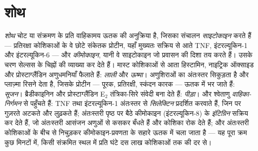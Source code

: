 \section{शोथ}

\begin{definition}[तीव्र शोथ]\label{def:b3:innate-immunity:inflammation}
\emph{शोथ} चोट या संक्रमण के प्रति वाहिकामय ऊतक की अनुक्रिया है, जिसका
संचालन \emph{साइटोकाइन} करते हैं --- प्रतिरक्षा कोशिकाओं के वे छोटे
संकेतक प्रोटीन, यहाँ मुख्यतः सक्रिय  से आते TNF,
इंटरल्यूकिन-1 और इंटरल्यूकिन-6 --- और \emph{कीमोकाइन}, यानी वे
साइटोकाइन जो प्रवासन की दिशा तय करते हैं। उसके चरण सेल्सस के चिह्नों की
व्याख्या कर देते हैं। मास्ट कोशिकाओं से आता हिस्टामिन, नाइट्रिक
ऑक्साइड और प्रोस्टाग्लैंडिन अणुधमनियाँ फैलाते हैं: \emph{लाली} और
\emph{ऊष्मा}। अणुशिराओं का अंतःस्तर सिकुड़ता है और प्लाज़्मा रिसने देता
है, जिसके प्रोटीन --- पूरक, प्रतिरक्षी, स्कंदन कारक --- ऊतक में भर
जाते हैं: \emph{सूजन}। ब्रैडीकाइनिन और प्रोस्टाग्लैंडिन E$_{2}$
तंत्रिका-सिरे संवेदी बना देते हैं: \emph{पीड़ा}। और श्वेताणु
\emph{वाहिका-निर्गमन} से पहुँचते हैं: TNF तथा इंटरल्यूकिन-1 अंतःस्तर
से \emph{सिलेक्टिन} प्रदर्शित करवाते हैं, जिन पर गुज़रते 
अटकते और लुढ़कते हैं; अंतःस्तरी पृष्ठ पर बैठे कीमोकाइन
(इंटरल्यूकिन-8)  के \emph{इंटिग्रिन} सक्रिय कर देते हैं,
जो अंतःस्तरी आसंजन अणुओं से कसकर बँधते हैं और कोशिका रोक देते हैं; और
 अंतःस्तरी कोशिकाओं के बीच से निचुड़कर कीमोकाइन-प्रवणता के
सहारे ऊतक में चला जाता है --- यह पूरा क्रम कुछ मिनटों में, किसी
संक्रमित स्थल में प्रति घंटे दस लाख कोशिकाओं तक की दर से।
\end{definition}

